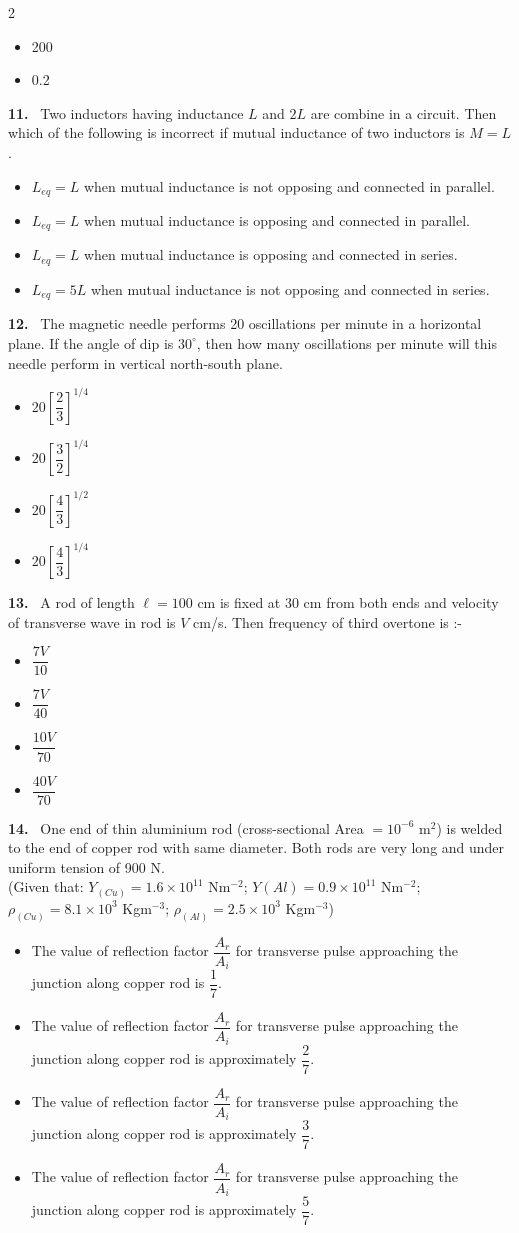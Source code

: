 \documentclass[10pt]{extarticle}
\newcommand{\qn}[1]{\par\smallskip\noindent\textbf{#1.}~}
\newenvironment{qoptions}{\begin{itemize}[leftmargin=1.8em,itemsep=1pt,topsep=2pt,label={}]}{\end{itemize}}
\newcommand{\opt}[2]{\item[(#1)] #2}
\begin{document}
\begin{multicols}{2}
\begin{qoptions}
\opt{C}{200}
\opt{D}{0.2}
\end{qoptions}
\qn{11} Two inductors having inductance $L$ and $2L$ are combine in a circuit. Then which of the following is incorrect if mutual inductance of two inductors is $M=L$.
\begin{qoptions}
\opt{A}{$L_{eq}=L$ when mutual inductance is not opposing and connected in parallel.}
\opt{B}{$L_{eq}=L$ when mutual inductance is opposing and connected in parallel.}
\opt{C}{$L_{eq}=L$ when mutual inductance is opposing and connected in series.}
\opt{D}{$L_{eq}=5L$ when mutual inductance is not opposing and connected in series.}
\end{qoptions}
\qn{12} The magnetic needle performs 20 oscillations per minute in a horizontal plane. If the angle of dip is $30^\circ$, then how many oscillations per minute will this needle perform in vertical north-south plane.
\begin{qoptions}
\opt{A}{$20\left[\dfrac23\right]^{1/4}$}
\opt{B}{$20\left[\dfrac32\right]^{1/4}$}
\opt{C}{$20\left[\dfrac43\right]^{1/2}$}
\opt{D}{$20\left[\dfrac43\right]^{1/4}$}
\end{qoptions}
\qn{13} A rod of length $\ell=100$ cm is fixed at 30 cm from both ends and velocity of transverse wave in rod is $V$ cm/s. Then frequency of third overtone is :-
\begin{qoptions}
\opt{A}{$\dfrac{7V}{10}$}
\opt{B}{$\dfrac{7V}{40}$}
\opt{C}{$\dfrac{10V}{70}$}
\opt{D}{$\dfrac{40V}{70}$}
\end{qoptions}
\qn{14} One end of thin aluminium rod (cross-sectional Area $=10^{-6}$ m$^2$) is welded to the end of copper rod with same diameter. Both rods are very long and under uniform tension of 900 N.\\
(Given that: $Y_{(Cu)}=1.6\times10^{11}$ Nm$^{-2}$; $Y(Al)=0.9\times10^{11}$ Nm$^{-2}$; $\rho_{(Cu)}=8.1\times10^3$ Kgm$^{-3}$; $\rho_{(Al)}=2.5\times10^3$ Kgm$^{-3}$)
\begin{qoptions}
\opt{A}{The value of reflection factor $\dfrac{A_r}{A_i}$ for transverse pulse approaching the junction along copper rod is $\dfrac17$.}
\opt{B}{The value of reflection factor $\dfrac{A_r}{A_i}$ for transverse pulse approaching the junction along copper rod is approximately $\dfrac27$.}
\opt{C}{The value of reflection factor $\dfrac{A_r}{A_i}$ for transverse pulse approaching the junction along copper rod is approximately $\dfrac37$.}
\opt{D}{The value of reflection factor $\dfrac{A_r}{A_i}$ for transverse pulse approaching the junction along copper rod is approximately $\dfrac57$.}

\end{qoptions}
\end{multicols}
\end{document}
